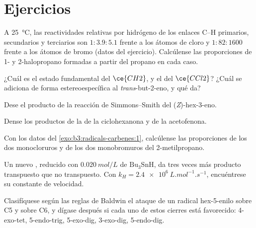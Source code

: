 \section{Ejercicios}

\begin{exercise}[$\star$]\label{exo:b3:radicals-carbenes:1}
A \qty{25}{\celsius}, las reactividades relativas por hidrógeno de los enlaces C--H primarios, secundarios y
terciarios son $1 : 3.9 : 5.1$ frente a los átomos de cloro y $1 : 82 : 1600$ frente a los
átomos de bromo (datos del ejercicio). Calcúlense las proporciones de 1- y 2-halopropano
formadas a partir del propano en cada caso.
\end{exercise}

\begin{exercise}[$\star$]\label{exo:b3:radicals-carbenes:2}
¿Cuál es el estado fundamental del $\ce{CH2}$, y el del $\ce{CCl2}$? ¿Cuál se adiciona de forma estereoespecífica al
\textit{trans}-but-2-eno, y qué da?
\end{exercise}

\begin{exercise}[$\star$]\label{exo:b3:radicals-carbenes:3}
Dese el producto de la reacción de Simmons--Smith del (\textit{Z})-hex-3-eno.
\end{exercise}

\begin{exercise}[$\star$]\label{exo:b3:radicals-carbenes:4}
Dense los productos de la  de la ciclohexanona y de la
acetofenona.
\end{exercise}

\begin{exercise}[$\star\star$]\label{exo:b3:radicals-carbenes:5}
Con los datos del \cref{exo:b3:radicals-carbenes:1}, calcúlense las proporciones de
los dos monocloruros y de los dos monobromuros del 2-metilpropano.
\end{exercise}

\begin{exercise}[$\star\star$]\label{exo:b3:radicals-carbenes:6}
Un nuevo , reducido con $\qty{0.020}{mol/L}$ de $\mathrm{Bu_3SnH}$, da tres veces más producto transpuesto
que no transpuesto. Con $k_H = \qty{2.4e6}{L.mol^{-1}.s^{-1}}$, encuéntrese su constante de velocidad.
\end{exercise}

\begin{exercise}[$\star\star$]\label{exo:b3:radicals-carbenes:7}
Clasifíquese según las reglas de Baldwin el ataque de un radical hex-5-enilo sobre C5 y sobre C6,
y dígase después si cada uno de estos cierres está favorecido: 4-exo-tet, 5-endo-trig,
5-exo-dig, 3-exo-dig, 5-endo-dig.
\end{exercise}

